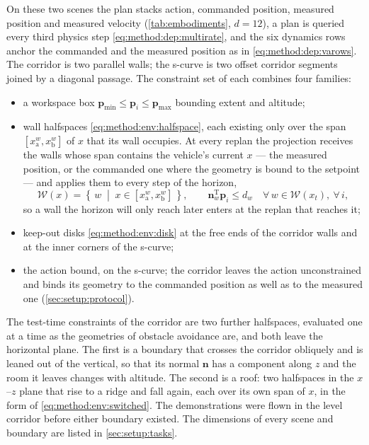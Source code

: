 \documentclass[headsepline,footsepline,footinclude=false,oneside,fontsize=11pt,paper=a4,listof=totoc,bibliography=totoc]{scrbook}
\theoremstyle{definition}
\theoremstyle{plain}
\theoremstyle{remark}
\newcommand{\vect}[1]{\boldsymbol{#1}}
\newcommand{\trans}{^{\textrm{T}}}
\newcommand{\sidx}[1]{_{\textrm{#1}}}
\begin{document}
On these two scenes the plan stacks action, commanded position, measured position and measured velocity
(\autoref{tab:embodiments}, $d = 12$), a plan is queried every third physics step
\eqref{eq:method:dep:multirate}, and the six dynamics rows anchor the commanded and the measured position
as in \eqref{eq:method:dep:varows}. The corridor is two parallel walls; the s-curve is two offset corridor
segments joined by a diagonal passage. The constraint set of each combines four families:
\begin{itemize}
  \item a workspace box $\vect{p}\sidx{min}\le\vect{p}_{i}\le\vect{p}\sidx{max}$ bounding extent and
    altitude;
  \item wall halfspaces \eqref{eq:method:env:halfspace}, each existing only over the span
    $[x\sidx{a}^{w},x\sidx{b}^{w}]$ of $x$ that its wall occupies. At every replan the projection receives
    the walls whose span contains the vehicle's current $x$ --- the measured position, or the commanded one
    where the geometry is bound to the setpoint --- and applies them to every step of the horizon,
    \begin{equation}\label{eq:method:env:switched}
      \mathcal{W}(x) = \left\{\,w \;\middle|\; x \in [x\sidx{a}^{w},x\sidx{b}^{w}]\,\right\},
      \qquad
      \vect{n}_{w}\trans\vect{p}_{i} \le d_{w}
      \quad \forall\, w \in \mathcal{W}(x_{t}),\ \forall\, i ,
    \end{equation}
    so a wall the horizon will only reach later enters at the replan that reaches it;
  \item keep-out disks \eqref{eq:method:env:disk} at the free ends of the corridor walls and at the
    inner corners of the s-curve;
  \item the action bound, on the s-curve; the corridor leaves the action unconstrained and binds its
    geometry to the commanded position as well as to the measured one (\autoref{sec:setup:protocol}).
\end{itemize}
The test-time constraints of the corridor are two further halfspaces, evaluated one at a time as the
geometries of obstacle avoidance are, and both leave the horizontal plane. The first is a boundary that
crosses the corridor obliquely and is leaned out of the vertical, so that its normal $\vect{n}$ has a
component along $z$ and the room it leaves changes with altitude. The second is a roof: two halfspaces
in the $x$--$z$ plane that rise to a ridge and fall again, each over its own span of $x$, in the form of
\eqref{eq:method:env:switched}. The demonstrations were flown in the level corridor before either
boundary existed. The dimensions of every scene and boundary are listed in \autoref{sec:setup:tasks}.
\end{document}
